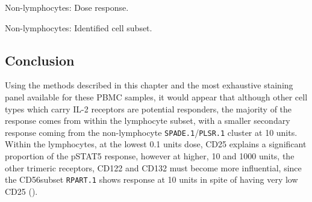 { Non-lymphocytes: Dose response. }
{ }


{ Non-lymphocytes: Identified cell subset. }
{ }


\clearpage


\subsection{Conclusion}

Using the methods described in this chapter and the most exhaustive staining panel available for these \gls{PBMC} samples, it would appear that
although other cell types which carry IL-2 receptors are potential responders, the majority of the response comes from within the lymphocyte subset,
with a smaller secondary response coming from the non-lymphocyte \texttt{SPADE.1}/\texttt{PLSR.1} cluster at 10 units.
Within the lymphocytes, at the lowest 0.1 units dose, CD25 explains a significant proportion of the pSTAT5 response,
however at higher, 10 and 1000 units, the other trimeric receptors, CD122 and CD132 must become more influential,
since the CD56\positive subset \texttt{RPART.1} shows response at 10 units in spite of having very low CD25 ().






